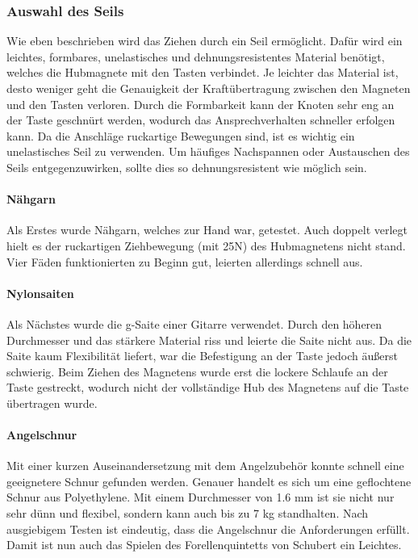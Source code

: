 \subsubsection{Auswahl des Seils}

Wie eben beschrieben wird das Ziehen durch ein Seil ermöglicht.
Dafür wird ein leichtes, formbares, unelastisches und dehnungsresistentes Material benötigt, welches die Hubmagnete mit den Tasten verbindet.
Je leichter das Material ist, desto weniger geht die Genauigkeit der Kraftübertragung zwischen den Magneten und den Tasten verloren.
Durch die Formbarkeit kann der Knoten sehr eng an der Taste geschnürt werden, wodurch das Ansprechverhalten schneller erfolgen kann.
Da die Anschläge ruckartige Bewegungen sind, ist es wichtig ein unelastisches Seil zu verwenden.
Um häufiges Nachspannen oder Austauschen des Seils entgegenzuwirken, sollte dies so dehnungsresistent wie möglich sein.

\paragraph{Nähgarn}

Als Erstes wurde Nähgarn, welches zur Hand war, getestet.
Auch doppelt verlegt hielt es der ruckartigen Ziehbewegung (mit 25N) des Hubmagnetens nicht stand.
Vier Fäden funktionierten zu Beginn gut, leierten allerdings schnell aus.

\paragraph{Nylonsaiten}

Als Nächstes wurde die g-Saite einer Gitarre verwendet.
Durch den höheren Durchmesser und das stärkere Material riss und leierte die Saite nicht aus.
Da die Saite kaum Flexibilität liefert, war die Befestigung an der Taste jedoch äußerst schwierig.
Beim Ziehen des Magnetens wurde erst die lockere Schlaufe an der Taste gestreckt, wodurch nicht der vollständige Hub des Magnetens auf die Taste übertragen wurde.

\paragraph{Angelschnur}

Mit einer kurzen Auseinandersetzung mit dem Angelzubehör konnte schnell eine geeignetere Schnur gefunden werden.
Genauer handelt es sich um eine geflochtene Schnur aus Polyethylene.
Mit einem Durchmesser von 1.6 mm ist sie nicht nur sehr dünn und flexibel, sondern kann auch bis zu 7 kg standhalten.
Nach ausgiebigem Testen ist eindeutig, dass die Angelschnur die Anforderungen erfüllt.
Damit ist nun auch das Spielen des Forellenquintetts von Schubert ein Leichtes.

